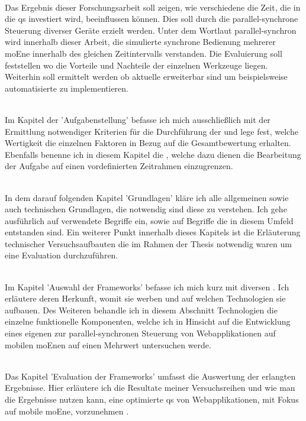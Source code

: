 \\Das Ergebnis dieser Forschungsarbeit soll zeigen, wie verschiedene  die Zeit, die in die \Gls{qs} investiert wird, beeinflussen können. Dies soll durch die \gls{parallel-synchron}e Steuerung diverser Geräte  erzielt werden. Unter dem Wortlaut \gls{parallel-synchron} wird innerhalb dieser Arbeit, die simulierte synchrone Bedienung mehrerer \Gls{moEn}e innerhalb des gleichen Zeitintervalls verstanden. Die Evaluierung soll feststellen wo die Vorteile und Nachteile der einzelnen Werkzeuge liegen. Weiterhin soll ermittelt werden ob aktuelle  erweiterbar sind um beispielsweise automatisierte  zu implementieren. 





\\Im Kapitel der 'Aufgabenstellung' befasse ich mich ausschließlich mit der Ermittlung notwendiger Kriterien für die Durchführung der  und lege fest, welche Wertigkeit die einzelnen Faktoren in Bezug auf die Gesamtbewertung erhalten. Ebenfalls benenne ich in diesem Kapitel die , welche dazu dienen die Bearbeitung der Aufgabe auf einen vordefinierten Zeitrahmen einzugrenzen.

\\In dem darauf folgenden Kapitel 'Grundlagen' kläre ich alle allgemeinen sowie auch technischen Grundlagen, die notwendig sind diese  zu verstehen. Ich gehe ausführlich auf verwendete Begriffe ein, sowie auf Begriffe die in diesem Umfeld entstanden sind. Ein weiterer Punkt innerhalb dieses Kapitels ist die Erläuterung technischer Versuchsaufbauten die im Rahmen der Thesis notwendig waren um eine Evaluation durchzuführen.

\\Im Kapitel 'Auswahl der \Gls{Framework}s' befasse ich mich kurz mit diversen . Ich erläutere deren Herkunft, womit sie werben und auf welchen Technologien sie aufbauen. Des Weiteren behandle ich in diesem Abschnitt Technologien die einzelne funktionelle Komponenten, welche ich in Hinsicht auf die Entwicklung eines eigenen  zur \gls{parallel-synchron}en Steuerung von Webapplikationen auf mobilen \Gls{moEn}en auf einen Mehrwert untersuchen werde.

\\Das Kapitel 'Evaluation der \Gls{Framework}s' umfasst die Auswertung der erlangten Ergebnisse. Hier erläutere ich die Resultate meiner Versuchsreihen und wie man die Ergebnisse nutzen kann, eine optimierte \Gls{qs} von Webapplikationen, mit Fokus auf mobile \Gls{moEn}e, vorzunehmen .

